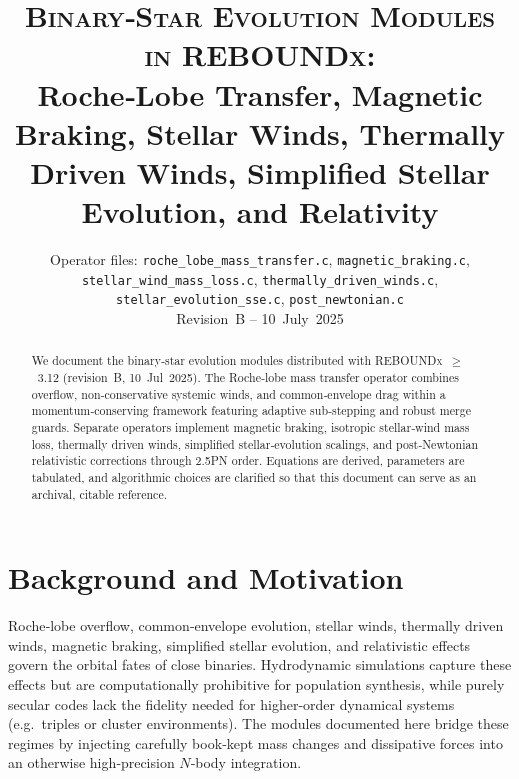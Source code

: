 \documentclass[11pt]{article}
\begin{document}
\title{\textsc{Binary‑Star Evolution Modules in
         \textnormal{REBOUNDx}}:\\
       Roche‑Lobe Transfer, Magnetic Braking, Stellar Winds, Thermally Driven Winds, Simplified
       Stellar Evolution, and Relativity}
\author{Operator files: \texttt{roche\_lobe\_mass\_transfer.c},
        \texttt{magnetic\_braking.c},
        \texttt{stellar\_wind\_mass\_loss.c},
        \texttt{thermally\_driven\_winds.c},
        \texttt{stellar\_evolution\_sse.c},
        \texttt{post\_newtonian.c}\\
        Revision B – 10 July 2025}
\date{}
\maketitle
\vspace*{-1.5em}

\begin{abstract}
We document the binary‑star evolution modules distributed with
\textsc{REBOUNDx} $\ge$ 3.12 (revision B, 10 Jul 2025).
The Roche‑lobe mass transfer operator combines overflow, non‑conservative
systemic winds, and common‑envelope drag within a momentum‑conserving
framework featuring adaptive sub‑stepping and robust merge guards.
Separate operators implement magnetic braking, isotropic stellar‑wind
mass loss, thermally driven winds, simplified stellar‑evolution scalings,
and post‑Newtonian relativistic corrections through 2.5PN order.  Equations are derived,
parameters are tabulated, and algorithmic
choices are clarified so that this document can serve as an archival,
citable reference.
\end{abstract}

\section{Background and Motivation}
\label{sec:intro}
Roche‑lobe overflow, common‑envelope evolution, stellar winds,
thermally driven winds, magnetic braking, simplified stellar evolution, and relativistic effects
govern the orbital fates of close binaries\citep{Eggleton1983,Ostriker1999,
Peters1964,Reimers1975,Verbunt1981,Kawaler1988,Hurley2000}.  Hydrodynamic
simulations capture these effects but are computationally prohibitive for
population synthesis, while purely secular codes lack the fidelity needed
for higher‑order dynamical systems (e.g.\ triples or cluster environments).
The modules documented here bridge these regimes by injecting carefully
book‑kept mass changes and dissipative forces into an otherwise
high‑precision $N$‑body integration.
\end{document}
